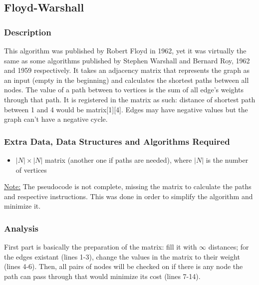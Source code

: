 \subsection{Floyd-Warshall}

\subsubsection{Description}
This algorithm was published by Robert Floyd in 1962, yet it was virtually the same as some algorithms published by Stephen Warshall and Bernard Roy, 1962 and 1959 respectively. It takes an adjacency matrix that represents the graph as an input (empty in the beginning) and calculates the shortest paths between all nodes. The value of a path between to vertices is the sum of all edge's weights through that path. It is registered in the matrix as such: distance of shortest path between 1 and 4 would be matrix[1][4]. Edges may have negative values but the graph can't have a negative cycle.

\subsubsection{Extra Data, Data Structures and Algorithms Required}
\begin{itemize}
    \item $ |N| \times |N| $ matrix (another one if paths are needed), where $ |N| $ is the number of vertices
\end{itemize}


\uline{Note:} The pseudocode is not complete, missing the matrix to calculate the paths and respective instructions. This was done in order to simplify the algorithm and minimize it.

\subsubsection{Analysis}
First part is basically the preparation of the matrix: fill it with $\infty$ distances; for the edges existant (lines 1-3), change the values in the matrix to their weight (lines 4-6). Then, all pairs of nodes will be checked on if there is any node the path can pass through that would minimize its cost (lines 7-14). 

